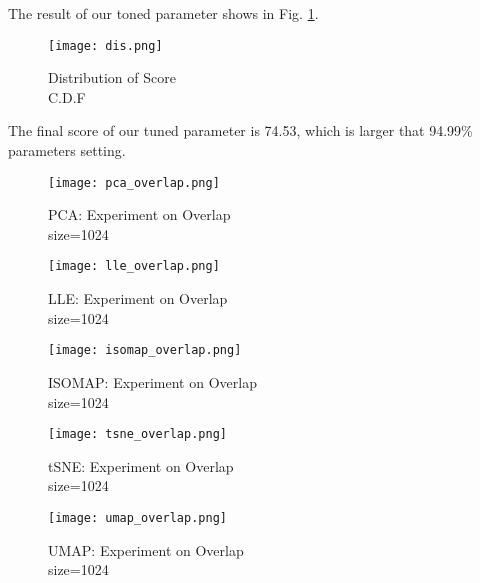 \documentclass[conference]{IEEEtran}
\begin{document}
The result of our toned parameter shows in Fig. \ref{fig:dis}.
\begin{figure}[htbp]
    \centerline{\texttt{[image: dis.png]}}
    \caption[This is the caption; This is the second line]
        {Distribution of Score\\C.D.F \endtabular}
    
    \label{fig:dis}
\end{figure}

The final score of our tuned parameter is 74.53,
which is larger that 94.99\% parameters setting.

\begin{figure}[htbp]
    \centerline{\texttt{[image: pca\_overlap.png]}}
    \caption[This is the caption; This is the second line]
        {PCA: Experiment on Overlap\\ size=1024 \endtabular}
    
    \label{fig:pca_overlap}
\end{figure}

\begin{figure}[htbp]
    \centerline{\texttt{[image: lle\_overlap.png]}}
    \caption[This is the caption; This is the second line]
        {LLE: Experiment on Overlap\\ size=1024 \endtabular}
    
    \label{fig:lle_overlap}
\end{figure}

\begin{figure}[htbp]
    \centerline{\texttt{[image: isomap\_overlap.png]}}
    \caption[This is the caption; This is the second line]
        {ISOMAP: Experiment on Overlap\\ size=1024 \endtabular}
    
    \label{fig:isomap_overlap}
\end{figure}

\begin{figure}[htbp]
    \centerline{\texttt{[image: tsne\_overlap.png]}}
    \caption[This is the caption; This is the second line]
        {tSNE: Experiment on Overlap\\ size=1024 \endtabular}
    
    \label{fig:tsne_overlap}
\end{figure}

\begin{figure}[htbp]
    \centerline{\texttt{[image: umap\_overlap.png]}}
    \caption[This is the caption; This is the second line]
        {UMAP: Experiment on Overlap\\ size=1024 \endtabular}
    
    \label{fig:umap_overlap}
\end{figure}
\end{document}
